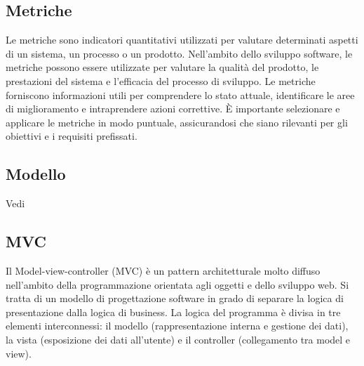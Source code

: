 \vspace{2em}
\subsection*{Metriche}
\par Le metriche sono indicatori quantitativi utilizzati per valutare determinati aspetti di un sistema, un processo o un prodotto. Nell'ambito dello sviluppo software, le metriche possono essere utilizzate per valutare la qualità del prodotto, le prestazioni del sistema e l'efficacia del processo di sviluppo. Le metriche forniscono informazioni utili per comprendere lo stato attuale, identificare le aree di miglioramento e intraprendere azioni correttive. È importante selezionare e applicare le metriche in modo puntuale, assicurandosi che siano rilevanti per gli obiettivi e i requisiti prefissati.

\vspace{2em}
\subsection*{Modello}
\par Vedi 

\vspace{2em}
\subsection*{MVC}
\par Il Model-view-controller (MVC) è un pattern architetturale molto diffuso nell'ambito della programmazione orientata agli oggetti e dello sviluppo web. Si tratta di un modello di progettazione software in grado di separare la logica di presentazione dalla logica di business. La logica del programma è divisa in tre elementi interconnessi: il modello (rappresentazione interna e gestione dei dati), la vista (esposizione dei dati all'utente) e il controller (collegamento tra model e view).
